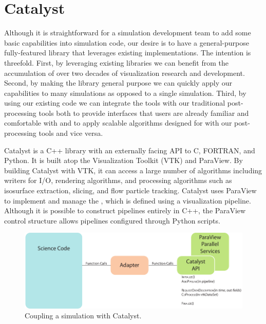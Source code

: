 \section{Catalyst}
\label{sec:Catalyst}

Although it is straightforward for a simulation development team to add some
basic \vda capabilities into simulation code, our desire is
to have a general-purpose fully-featured library that leverages existing
implementations.  The intention is threefold.  First, by leveraging existing
\vda libraries we can benefit from the accumulation of over two decades of
visualization research and development.  Second, by making the library general
purpose we can quickly apply our \insitu \vda capabilities to many simulations
as opposed to a single simulation.  Third, by using our existing code we can
integrate the \insitu tools with our traditional post-processing tools both to
provide interfaces that users are already familiar and comfortable with and to
apply scalable algorithms designed for \insitu with our post-processing tools
and vice versa.

Catalyst is a C++ library with an externally facing API to C, FORTRAN, and
Python.  It is built atop the Visualization Toolkit (VTK) and
ParaView.  By building Catalyst with VTK, it can access a
large number of algorithms including writers for I/O, rendering algorithms,
and processing algorithms such as isosurface extraction, slicing, and flow
particle tracking.  Catalyst uses ParaView to implement and manage the
\vda, which is defined using a visualization
pipeline.  Although it is possible to construct
pipelines entirely in C++, the ParaView control structure allows pipelines
configured through Python scripts.

\begin{figure}[htb]
  \centering
  \includegraphics{figures/CatalystCoupling}
  \caption{Coupling a simulation with Catalyst.}
  \label{fig:CatalystCoupling}
\end{figure}

